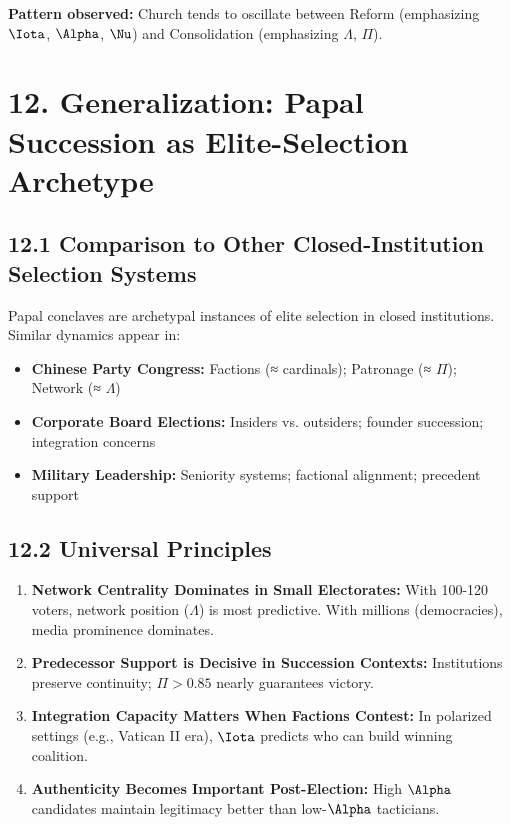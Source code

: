 \documentclass[11pt]{article}
\begin{document}
\textbf{Pattern observed:} Church tends to oscillate between Reform (emphasizing $\Iota$, $\Alpha$, $\Nu$) and Consolidation (emphasizing $\Lambda$, $\Pi$).

\section{12. Generalization: Papal Succession as Elite-Selection Archetype}

\subsection{12.1 Comparison to Other Closed-Institution Selection Systems}

Papal conclaves are archetypal instances of elite selection in closed institutions. Similar dynamics appear in:

\begin{itemize}
\item \textbf{Chinese Party Congress:} Factions (≈ cardinals); Patronage (≈ $\Pi$); Network (≈ $\Lambda$)
\item \textbf{Corporate Board Elections:} Insiders vs. outsiders; founder succession; integration concerns
\item \textbf{Military Leadership:} Seniority systems; factional alignment; precedent support
\end{itemize}

\subsection{12.2 Universal Principles}

\begin{enumerate}
\item \textbf{Network Centrality Dominates in Small Electorates:} With 100-120 voters, network position ($\Lambda$) is most predictive. With millions (democracies), media prominence dominates.

\item \textbf{Predecessor Support is Decisive in Succession Contexts:} Institutions preserve continuity; $\Pi > 0.85$ nearly guarantees victory.

\item \textbf{Integration Capacity Matters When Factions Contest:} In polarized settings (e.g., Vatican II era), $\Iota$ predicts who can build winning coalition.

\item \textbf{Authenticity Becomes Important Post-Election:} High $\Alpha$ candidates maintain legitimacy better than low-$\Alpha$ tacticians.

\end{enumerate}
\end{document}
